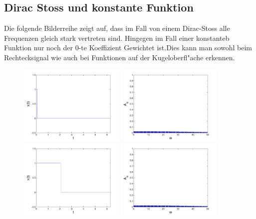 \begin{refsection}
\section{Dirac Stoss und konstante Funktion}

Die folgende Bilderreihe zeigt auf, dass im Fall von einem Dirac-Stoss
alle Frequenzen gleich stark vertreten sind. 
Hingegen im Fall einer konstanteb Funktion nur noch der 0-te 
Koeffizient Gewichtet ist.Dies kann man sowohl beim Rechtecksignal 
wie auch bei Funktionen auf der Kugeloberfl"ache erkennen.

\begin{figure}
\centering
\includegraphics[width=0.45\textwidth]{kugel/Dkonstant/Rechteck1_1.pdf}
\includegraphics[width=0.45\textwidth]{kugel/Dkonstant/Rechteck1_2.pdf}
\includegraphics[width=0.45\textwidth]{kugel/Dkonstant/Rechteck2_1.pdf}
\includegraphics[width=0.45\textwidth]{kugel/Dkonstant/Rechteck1_2.pdf}

\end{figure}
\end{refsection}
